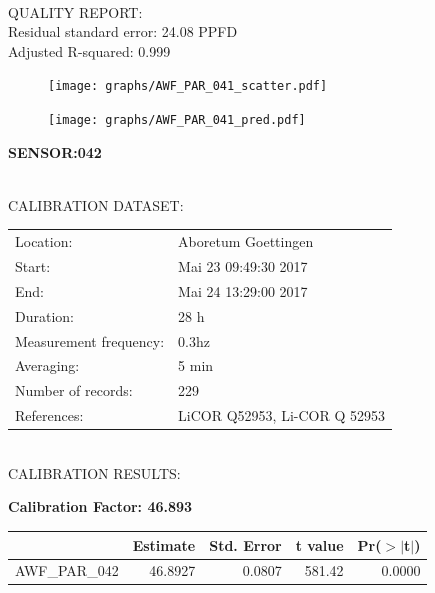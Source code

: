 \documentclass[oneside]{report}
\begin{document}
\hrulefill\\
QUALITY REPORT:\\
Residual standard error: 24.08 PPFD\\
Adjusted R-squared: 0.999



\begin{figure}[H]
  \centering
  \texttt{[image: graphs/AWF\_PAR\_041\_scatter.pdf]}
\end{figure}




\begin{figure}[H]
  \centering
  \texttt{[image: graphs/AWF\_PAR\_041\_pred.pdf]}
\end{figure}

\pagebreak


\begin{center}
\large{\textbf{SENSOR:042}}\\
\end{center}

\hrulefill\\
CALIBRATION DATASET:\\
\begin{table}[h!]
  \centering
  \label{tab:table1}
  \begin{tabular}{ll}
    Location: & Aboretum Goettingen\\ 
    
    
    Start:  & Mai 23 09:49:30 2017 \\
    End:   & Mai 24 13:29:00 2017\\ 
    Duration: & 28 h\\
    Measurement frequency: & 0.3hz\\
    Averaging:  &5 min\\
    Number of records: & 229 \\
    References: & LiCOR Q52953, Li-COR Q 52953 \\
  \end{tabular}
\end{table}

\hrulefill\\
CALIBRATION RESULTS:\\


\begin{center}
\textbf{\large{Calibration Factor: 46.893}}\\
\end{center}
\begin{table}[ht]
\centering
\begin{tabular}{rrrrr}
  \hline
 & Estimate & Std. Error & t value & Pr($>$$|$t$|$) \\ 
  \hline
AWF\_PAR\_042 & 46.8927 & 0.0807 & 581.42 & 0.0000 \\ 
   \hline
\end{tabular}
\end{table}
\end{document}
